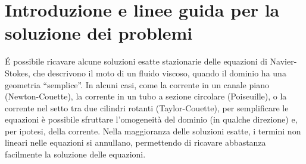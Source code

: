 \section{Introduzione e linee guida per la soluzione dei problemi}

\'E possibile ricavare alcune soluzioni esatte stazionarie delle equazioni di Navier-Stokes, che descrivono il moto di un fluido viscoso, quando il dominio ha una geometria ``semplice''. In alcuni casi, come la corrente in un canale piano (Newton-Couette), la corrente in un tubo a sezione circolare (Poiseuille), o la corrente nel setto tra due cilindri rotanti (Taylor-Couette), per semplificare le equazioni è possibile sfruttare l'omogeneità del dominio (in qualche direzione) e, per ipotesi, della corrente. Nella maggioranza delle soluzioni esatte, i termini non lineari nelle equazioni si annullano, permettendo di ricavare abbastanza facilmente la soluzione delle equazioni.

